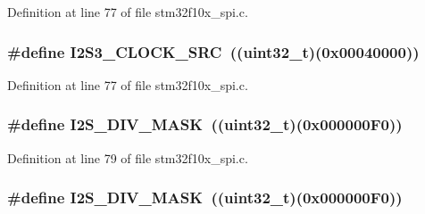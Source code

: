 Definition at line 77 of file stm32f10x\+\_\+spi.\+c.

\subsubsection[{\texorpdfstring{I2\+S3\+\_\+\+C\+L\+O\+C\+K\+\_\+\+S\+RC}{I2S3_CLOCK_SRC}}]{\setlength{\rightskip}{0pt plus 5cm}\#define I2\+S3\+\_\+\+C\+L\+O\+C\+K\+\_\+\+S\+RC~(({\bf uint32\+\_\+t})(0x00040000))}\hypertarget{group___s_p_i___private___defines_gabb67971448c15090f3372e3875db3d23}{}\label{group___s_p_i___private___defines_gabb67971448c15090f3372e3875db3d23}


Definition at line 77 of file stm32f10x\+\_\+spi.\+c.

\subsubsection[{\texorpdfstring{I2\+S\+\_\+\+D\+I\+V\+\_\+\+M\+A\+SK}{I2S_DIV_MASK}}]{\setlength{\rightskip}{0pt plus 5cm}\#define I2\+S\+\_\+\+D\+I\+V\+\_\+\+M\+A\+SK~(({\bf uint32\+\_\+t})(0x000000\+F0))}\hypertarget{group___s_p_i___private___defines_ga26cdb43c45ac655c792c5af0a6bbb0bf}{}\label{group___s_p_i___private___defines_ga26cdb43c45ac655c792c5af0a6bbb0bf}


Definition at line 79 of file stm32f10x\+\_\+spi.\+c.

\subsubsection[{\texorpdfstring{I2\+S\+\_\+\+D\+I\+V\+\_\+\+M\+A\+SK}{I2S_DIV_MASK}}]{\setlength{\rightskip}{0pt plus 5cm}\#define I2\+S\+\_\+\+D\+I\+V\+\_\+\+M\+A\+SK~(({\bf uint32\+\_\+t})(0x000000\+F0))}\hypertarget{group___s_p_i___private___defines_ga26cdb43c45ac655c792c5af0a6bbb0bf}{}\label{group___s_p_i___private___defines_ga26cdb43c45ac655c792c5af0a6bbb0bf}


